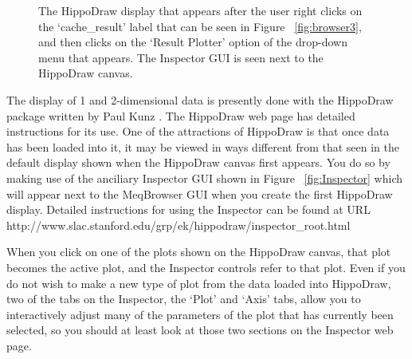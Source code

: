\documentclass[10pt]{article}
\begin{document}
\begin{figure}
{\par\centering
{}
\par}
\caption {The HippoDraw display that appears after the user
right clicks on the `cache\_result' label that can be seen in
Figure ~\ref{fig:browser3}, and then clicks on the `Result Plotter' option
of the drop-down menu that appears. The Inspector GUI is seen next to
the HippoDraw canvas.}
\label{fig:browser4}
\end{figure}

The display of 1 and 2-dimensional data is presently done with the
HippoDraw package written by Paul Kunz \cite{kunz}. The HippoDraw web 
page \cite{kunz} has
detailed instructions for its use. One of the attractions 
of HippoDraw is that once data has been loaded into it, it may be 
viewed in ways different from that seen in the default display
shown when the HippoDraw canvas first appears. You do so by making
use of the anciliary Inspector GUI shown in Figure  ~\ref{fig:Inspector} which
will appear next to the MeqBrowser GUI when you create 
the first HippoDraw display. Detailed instructions for using
the Inspector can be found at 
URL http://www.slac.stanford.edu/grp/ek/hippodraw/inspector\_root.html

When you click on one of the plots shown on the HippoDraw canvas,
that plot becomes the active plot, and the Inspector controls
refer to that plot. 
Even if you do not wish to make a new type of plot from the
data loaded into HippoDraw, two of the tabs on the Inspector, the
`Plot' and `Axis' tabs, allow you to interactively adjust many of the
parameters of the plot that has currently been selected, so you
should at least look at those two sections on the Inspector  
web page.
\end{document}
